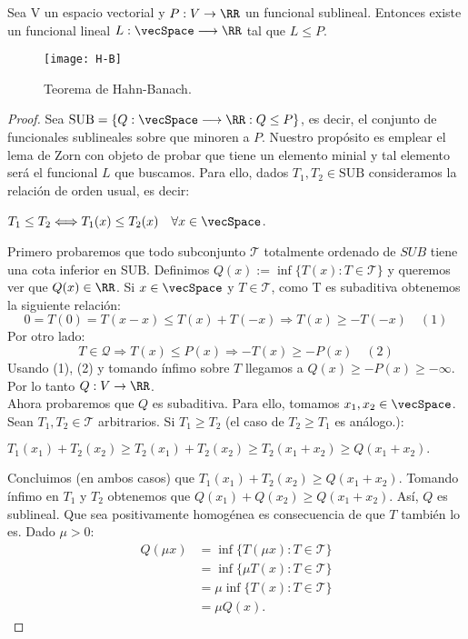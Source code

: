 \bigskip
	\begin{teoremaBox}\label{H-B}
		Sea V un espacio vectorial y $P:V \rightarrow \RR$ un funcional sublineal. Entonces existe un funcional lineal $ L:\vecSpace \longrightarrow \RR $ tal que $ L \leq P $.
	\end{teoremaBox}
\begin{figure}[h!]
	\centering
	\texttt{[image: H-B]}
	\caption{Teorema de Hahn-Banach.}
\end{figure}

	\begin{proof}
		Sea $ \text{SUB} = \lbrace Q:\vecSpace \longrightarrow \RR : Q \leq P \rbrace$, es decir, el conjunto de funcionales sublineales sobre \vecSpace que minoren a $ P $. Nuestro propósito es emplear el lema de Zorn con objeto de probar que tiene un elemento minial y tal elemento será el funcional $ L $ que buscamos. Para ello, dados $ T_1 ,T_2 \in \text{SUB} $ consideramos la relación de orden usual, es decir:
		\begin{center}
			$ T_1 \leq T_2 \Longleftrightarrow T_1 (x) \leq T_2 (x) \quad \forall x \in \vecSpace $.
		\end{center}
		Primero probaremos que todo subconjunto $ \mathcal{T} $ totalmente ordenado de $SUB $ tiene una cota inferior en  SUB. Definimos $ Q(x):=\inf \{ T(x): T \in \mathcal{T} \} $ y queremos ver que $ Q(x) \in \RR $. Si $ x \in \vecSpace $ y $ T \in \mathcal{T} $, como T es subaditiva obtenemos la siguiente relación:
		\[ 0 = T(0) = T(x-x) \leq T(x) + T(-x) \Longrightarrow T(x) \geq -T(-x) \quad (1)\]  
		Por otro lado:
		\[ T \in \mathcal{Q} \Longrightarrow T(x) \leq P(x) \Longrightarrow -T(x) \geq -P(x) \quad (2)\] 
		Usando (1), (2) y tomando ínfimo sobre $  T $  llegamos a $ Q(x) \geq -P(x) \geq - \infty $. Por lo tanto $ Q:V \rightarrow \RR$. \\
		
		Ahora probaremos que $ Q $ es subaditiva. Para ello, tomamos $ x_1, x_2\in \vecSpace $. Sean $ T_1 , T_2 \in \mathcal{T} $ arbitrarios. Si $ T_1 \geq T_2 $ (el caso de $ T_2 \geq T_1 $ es análogo.):
		
		\begin{center}
			$ T_1 (x_1)+  T_2 (x_2) \geq T_2(x_1)+  T_2 (x_2) \geq T_2(x_1 +x_2) \geq Q(x_1 + x_2).$
		\end{center}
		Concluimos (en ambos casos) que $ T_1 (x_1)+  T_2 (x_2) \geq Q(x_1 + x_2)$. Tomando ínfimo en $ T_1 $ y $ T_2 $ obtenemos que $ Q (x_1)+  Q(x_2) \geq Q(x_1 + x_2)$. Así, $ Q $ es sublineal. Que sea positivamente homogénea es consecuencia de que $ T $ también lo es. Dado $ \mu > 0 $:
		\begin{equation*}
		\begin{split}
		Q(\mu x) &=\inf \{ T(\mu x): T \in \mathcal{T} \} \\ 
		& = \inf \{ \mu T( x): T \in \mathcal{T} \} \\ 
		&= \mu\inf \{ T( x): T \in \mathcal{T} \} \\ 
		&= \mu Q(x). 
		\end{split}
		\end{equation*}
		

\end{proof}
